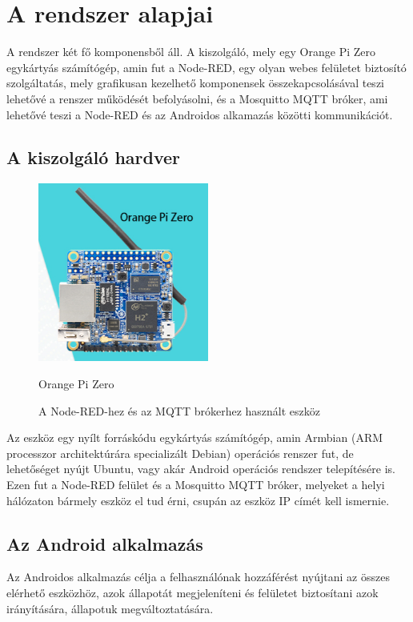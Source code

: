 \documentclass[
]{thesis-ekf}
\theoremstyle{definition}
\theoremstyle{remark}
\begin{document}
\chapter{A rendszer alapjai}
A rendszer két fő komponensből áll. A kiszolgáló, mely egy Orange Pi Zero egykártyás számítógép, amin fut a Node-RED, egy olyan webes felületet biztosító szolgáltatás, mely grafikusan kezelhető komponensek összekapcsolásával teszi lehetővé a renszer működését befolyásolni, és a Mosquitto MQTT bróker, ami lehetővé teszi a Node-RED\cite{nodeRed} és az Androidos alkamazás közötti kommunikációt.

\section{A kiszolgáló hardver}
\begin{figure}
	\centering
	\includegraphics[width=0.5\textwidth]{images/OPIZero.png}
	\caption{Orange Pi Zero\cite{orange}}
	\caption{A Node-RED-hez és az MQTT brókerhez használt eszköz}
\end{figure}	
Az eszköz egy nyílt forráskódu egykártyás számítógép, amin Armbian\cite{armbian} (ARM processzor architektúrára specializált Debian) operációs renszer fut, 
de lehetőséget nyújt Ubuntu, vagy akár Android operációs rendszer telepítésére is. Ezen fut a Node-RED felület és a Mosquitto MQTT bróker, 
melyeket a helyi hálózaton bármely eszköz el tud érni, csupán az eszköz IP címét kell ismernie.

\section{Az Android alkalmazás}
Az Androidos alkalmazás célja a felhasználónak hozzáférést nyújtani az összes elérhető eszközhöz, 
azok állapotát megjeleníteni és felületet biztosítani azok irányítására, állapotuk megváltoztatására. 
\end{document}

